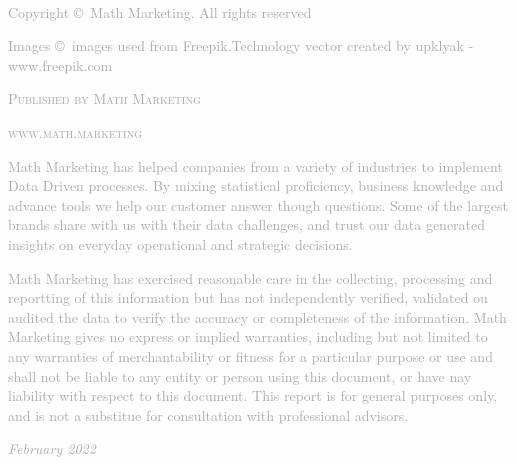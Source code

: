 \newpage
~\vfill
\thispagestyle{empty}
\NoBgThispage

\noindent \textcolor{DarkGray}{Copyright \copyright\ Math Marketing. All rights reserved \\} %

\noindent \textcolor{DarkGray}{Images \copyright\ images used from Freepik.Technology vector created by upklyak - www.freepik.com \\}

\noindent \textcolor{DarkGray}{\textsc{Published by Math Marketing}\\} %

\noindent \textcolor{DarkGray}{\textsc{www.math.marketing}\\} %

\noindent \textcolor{DarkGray}{Math Marketing has helped companies from a variety of industries to implement Data Driven processes. By mixing statistical proficiency, business knowledge and advance tools we help our customer answer though questions. Some of the largest brands share with us with their data challenges, and trust our data generated insights on everyday operational and strategic decisions.\\} %

\noindent \textcolor{DarkGray}{Math Marketing has exercised reasonable care in the collecting, processing and reportting of this information but has not independently verified, validated ou audited the data to verify the accuracy or completeness of the information. Math Marketing gives no express or implied warranties, including but not limited to any warranties of merchantability or fitness for a particular purpose or use and shall not be liable to any entity or person using this document, or have nay liability with respect to this document. This report is for general purposes only, and is not a substitue for consultation with professional advisors.\\} %

\noindent \textcolor{DarkGray}{\textit{February 2022}} %